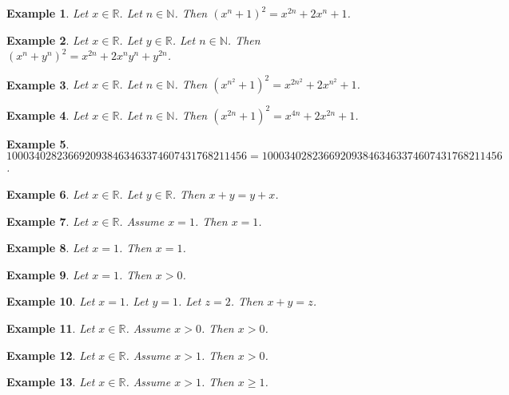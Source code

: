 \documentclass{article}
\newtheorem{example}{Example}
\begin{document}
\begin{example}
Let $x\in\mathbb{R}$. Let $n\in\mathbb{N}$. Then ${(x^n+1)}^2=x^{2n}+2x^n+1$.
\end{example}

\begin{example}
Let $x\in\mathbb{R}$. Let $y\in\mathbb{R}$. Let $n\in\mathbb{N}$. Then ${(x^n+y^n)}^2=x^{2n}+2x^ny^n+y^{2n}$.
\end{example}

\begin{example}
Let $x\in\mathbb{R}$. Let $n\in\mathbb{N}$. Then ${(x^{n^2}+1)}^2=x^{2n^2}+2x^{n^2}+1$.
\end{example}

\begin{example}
Let $x\in\mathbb{R}$. Let $n\in\mathbb{N}$. Then ${(x^{2n}+1)}^2=x^{4n}+2x^{2n}+1$.
\end{example}

\begin{example}
    $1000340282366920938463463374607431768211456=1000340282366920938463463374607431768211456$.
\end{example}

\begin{example}
Let $x\in\mathbb{R}$. Let $y\in\mathbb{R}$. Then $x+y=y+x$.
\end{example}

\begin{example}
Let $x\in\mathbb{R}$. Assume $x=1$. Then $x=1$.
\end{example}

\begin{example}
Let $x=1$. Then $x=1$.
\end{example}

\begin{example}
Let $x=1$. Then $x>0$.
\end{example}

\begin{example}
Let $x=1$. Let $y=1$. Let $z=2$. Then $x+y=z$.
\end{example}

\begin{example}
Let $x\in\mathbb{R}$. Assume $x>0$. Then $x>0$.
\end{example}

\begin{example}
Let $x\in\mathbb{R}$. Assume $x>1$. Then $x>0$.
\end{example}

\begin{example}
Let $x\in\mathbb{R}$. Assume $x>1$. Then $x\ge 1$.
\end{example}
\end{document}
